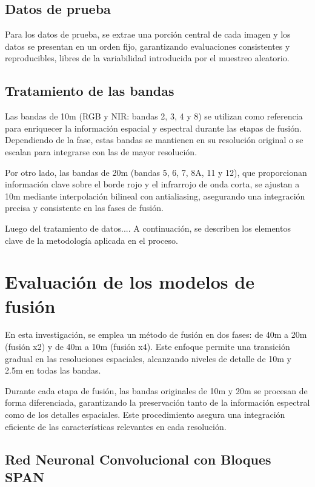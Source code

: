     \subsection{Datos de prueba}

        Para los datos de prueba, se extrae una porción central de cada imagen y los datos se presentan en un orden fijo, garantizando evaluaciones consistentes y reproducibles, libres de la variabilidad introducida por el muestreo aleatorio.

    \subsection{Tratamiento de las bandas}
        
        Las bandas de 10m (RGB y NIR: bandas 2, 3, 4 y 8) se utilizan como referencia para enriquecer la información espacial y espectral durante las etapas de fusión. Dependiendo de la fase, estas bandas se mantienen en su resolución original o se escalan para integrarse con las de mayor resolución.

        Por otro lado, las bandas de 20m (bandas 5, 6, 7, 8A, 11 y 12), que proporcionan información clave sobre el borde rojo y el infrarrojo de onda corta, se ajustan a 10m mediante interpolación bilineal con antialiasing, asegurando una integración precisa y consistente en las fases de fusión.


Luego del tratamiento de datos.... A continuación, se describen los elementos clave de la metodología aplicada en el proceso.


\section{Evaluación de los modelos de fusión}

    En esta investigación, se emplea un método de fusión en dos fases: de 40m a 20m (fusión x2) y de 40m a 10m (fusión x4). Este enfoque permite una transición gradual en las resoluciones espaciales, alcanzando niveles de detalle de 10m y 2.5m en todas las bandas.

    Durante cada etapa de fusión, las bandas originales de 10m y 20m se procesan de forma diferenciada, garantizando la preservación tanto de la información espectral como de los detalles espaciales. Este procedimiento asegura una integración eficiente de las características relevantes en cada resolución.

    \subsection{Red Neuronal Convolucional con Bloques SPAN}      
        
